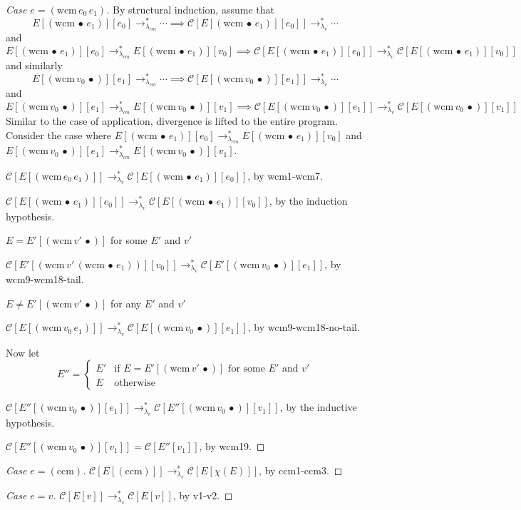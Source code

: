 \documentclass[ms,electronic,twosidetoc,letterpaper,chaptercenter,parttop]{byumsphd}
\newcommand{\lvrrs}{\rightarrow_{\lambda_v}^{*}}
\newcommand{\cmrrs}{\rightarrow_{\lambda_{cm}}^{*}}
\newcommand{\C}[1]{\mathcal{C}[#1]}
\newcommand{\wcm}[2]{(\mathrm{wcm}\,#1\,#2)}
\newcommand{\ccm}{(\mathrm{ccm})}
\newcommand{\hole}{\bullet}
\begin{document}
\begin{proof}[Case $e=\wcm{e_0}{e_1}$]
By structural induction, assume that 
\[
E[\wcm{\hole}{e_1}][e_0]\cmrrs\cdots\implies\C{E[\wcm{\hole}{e_1}][e_0]}\lvrrs\cdots
\]
and
\[
E[\wcm{\hole}{e_1}][e_0]\cmrrs E[\wcm{\hole}{e_1}][v_0]\implies\C{E[\wcm{\hole}{e_1}][e_0]}\lvrrs\C{E[\wcm{\hole}{e_1}][v_0]}
\]
and similarly
\[
E[\wcm{v_0}{\hole}][e_1]\cmrrs\cdots\implies\C{E[\wcm{v_0}{\hole}][e_1]}\lvrrs\cdots
\]
and
\[
E[\wcm{v_0}{\hole}][e_1]\cmrrs E[\wcm{v_0}{\hole}][v_1]\implies\C{E[\wcm{v_0}{\hole}][e_1]}\lvrrs\C{E[\wcm{v_0}{\hole}][v_1]}
\]
Similar to the case of application, divergence is lifted to the entire program. Consider the case where $E[\wcm{\hole}{e_1}][e_0]\cmrrs E[\wcm{\hole}{e_1}][v_0]$ and $E[\wcm{v_0}{\hole}][e_1]\cmrrs E[\wcm{v_0}{\hole}][v_1]$.


$\C{E[\wcm{e_0}{e_1}]}\lvrrs\C{E[\wcm{\hole}{e_1}][e_0]}$, by wcm1-wcm7.

$\C{E[\wcm{\hole}{e_1}][e_0]}\lvrrs\C{E[\wcm{\hole}{e_1}][v_0]}$, by the induction hypothesis.

\begin{case}{$E=E'[\wcm{v'}{\hole}]$ for some $E'$ and $v'$}

$\C{E'[\wcm{v'}{\wcm{\hole}{e_1}}][v_0]}\lvrrs\C{E'[\wcm{v_0}{\hole}][e_1]}$, by wcm9-wcm18-tail.
\end{case}

\begin{case}{$E\ne E'[\wcm{v'}{\hole}]$ for any $E'$ and $v'$}

$\C{E[\wcm{v_0}{e_1}]}\lvrrs\C{E[\wcm{v_0}{\hole}][e_1]}$, by wcm9-wcm18-no-tail.
\end{case}

Now let 
\[
E''=\begin{cases}
E' &\text{if $E=E'[\wcm{v'}{\hole}]$ for some $E'$ and $v'$}\\
E  &\text{otherwise}
\end{cases}
\]

$\C{E''[\wcm{v_0}{\hole}][e_1]}\lvrrs\C{E''[\wcm{v_0}{\hole}][v_1]}$, by the inductive hypothesis.

$\C{E''[\wcm{v_0}{\hole}][v_1]}=\C{E''[v_1]}$, by wcm19.

\end{proof}

\begin{proof}[Case $e=\ccm$]
$\C{E[\ccm]}\lvrrs\C{E[\chi(E)]}$, by ccm1-ccm3.
\end{proof}

\begin{proof}[Case $e=v$]
$\C{E[v]}\lvrrs\C{E[v]}$, by v1-v2.
\end{proof}
\end{document}
